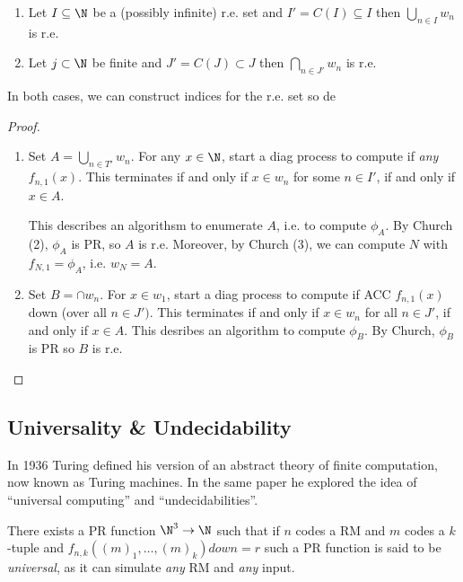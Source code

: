 \documentclass[a4paper]{article}
\begin{document}


\begin{thm}\leavevmode
  \begin{enumerate}
\item Let \(I \subseteq \N\) be a (possibly infinite) r.e. set and \(I' =C(I) \subseteq I\) then \(\bigcup_{n\in I}w_n\) is r.e.
\item Let \(j \subset \N\) be finite and \(J' = C(J) \subset J\) then \(\bigcap_{n\in J'}w_n\) is r.e.
  \end{enumerate}
\end{thm}

In both cases, we can construct indices for the r.e. set so de

\begin{proof}\leavevmode
  \begin{enumerate}
  \item Set \(A = \bigcup_{n\in T'}w_n\). For any \(x\in \N\), start a diag process to compute if \emph{any} \(f_{n,1}(x)\). This terminates if and only if \(x\in w_n\) for some \(n\in I'\), if and only if \(x \in A\).

  This describes an algorithsm to enumerate \(A\), i.e. to compute \(\phi_A\). By Church (2), \(\phi_A\) is PR, so \(A\) is r.e. Moreover, by Church (3), we can compute \(N\) with \(f_{N,1} = \phi_A\), i.e. \(w_N = A\).
\item Set \(B = \cap w_n\). For \(x\in w_1\), start a diag process to compute if ACC \(f_{n,1}(x)\) down (over all \(n\in J')\). This terminates if and only if \(x\in w_n\) for all \(n\in J'\), if and only if \(x\in A\).
  This desribes an algorithm to compute \(\phi_B\). By Church, \(\phi_B\) is PR so \(B\) is r.e. 
  \end{enumerate}
\end{proof}

\subsection{Universality \& Undecidability}

In 1936 Turing defined his version of an abstract theory of finite computation, now known as Turing machines. In the same paper he explored the idea of ``universal computing'' and ``undecidabilities''.

\begin{thm}
  There exists a PR function \(\N^3\to \N\) such that if \(n\) codes a RM and \(m\) codes a \(k\)-tuple and \(f_{n,k}((m)_1,\dots,(m)_k) down = r\)
  such a PR function is said to be \emph{universal}, as it can simulate \emph{any} RM and \emph{any} input.
\end{thm}
\end{document}

